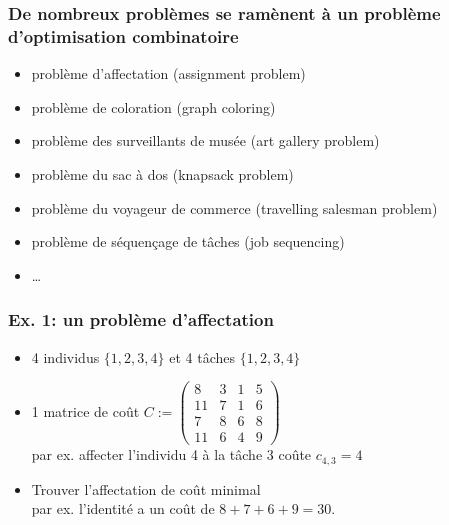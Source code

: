 \documentclass{beamer}
\begin{document}
\begin{frame}
  \frametitle{De nombreux problèmes se ramènent à un problème
    d'optimisation combinatoire}

  \begin{itemize}
    \item \alert{problème d'affectation (assignment problem)}
    \item \alert{problème de coloration (graph coloring)}
    \item problème des surveillants de musée (art gallery problem)
    \item problème du sac à dos (knapsack problem)
    \item problème du voyageur de commerce (travelling salesman problem)
    \item problème de séquençage de tâches (job sequencing)
    \item \dots
  \end{itemize}
  
\end{frame}

\begin{frame}
  \frametitle{Ex. 1: un problème d'affectation}

  \begin{itemize}
  \item 4 individus $\{1,2,3,4\}$ et 4 tâches $\{1,2,3,4\}$
  \item 1 matrice de coût
    $C := \left(
    \begin{array}{cccc}
      8 & 3 & 1 & 5 \\
      11 & 7 & 1 & 6 \\
      7 & 8 & 6 & 8 \\
      11 & 6 & 4 & 9 
    \end{array}
    \right)$ \\
    par ex. affecter l'individu 4 à la tâche 3 coûte $c_{4,3} = 4$ 
  \item Trouver l'affectation de coût minimal \\
    par ex. l'identité a un coût de $8+7+6+9=30$. 
  \end{itemize}

\end{frame}
\end{document}
